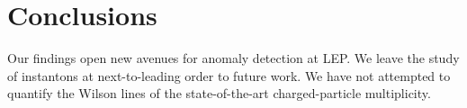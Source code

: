 \section{Conclusions}\label{sec:conclusions}

Our findings open new avenues for anomaly detection at LEP. We leave the
study of instantons at next-to-leading order to future work. We have not
attempted to quantify the Wilson lines of the state-of-the-art
charged-particle multiplicity.

